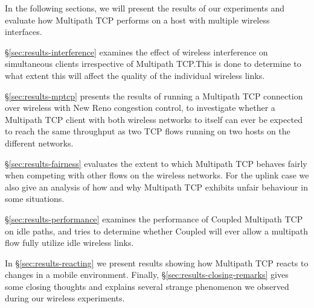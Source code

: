In the following sections, we will present the results of our experiments and
evaluate how Multipath TCP performs on a host with multiple wireless
interfaces.

\S\ref{sec:results-interference} examines the effect of wireless
interference on simultaneous clients irrespective of Multipath TCP.\@ This is
done to determine to what extent this will affect the quality of the individual
wireless links.

\S\ref{sec:results-mptcp} presents the results of running a Multipath TCP
connection over wireless with New Reno congestion control, to investigate whether
a Multipath TCP client with both wireless networks to
itself can ever be expected to reach the same throughput as two TCP flows running on two hosts
on the different networks.

\S\ref{sec:results-fairness} evaluates the extent to which Multipath TCP behaves
fairly when competing with other flows on the wireless networks. For the uplink
case we also give an analysis of how and why Multipath TCP exhibits unfair
behaviour in some situations.

\S\ref{sec:results-performance} examines the performance of Coupled Multipath
TCP on idle paths, and tries to determine whether Coupled will ever allow a
multipath flow fully utilize idle wireless links.

In \S\ref{sec:results-reacting} we present results showing how Multipath TCP
reacts to changes in a mobile environment. Finally,
\S\ref{sec:results-closing-remarks} gives some closing thoughts and explains
several strange phenomenon we observed during our wireless experiments.
